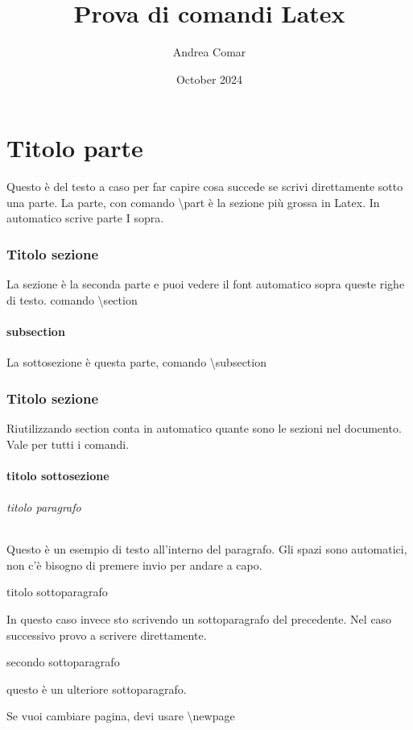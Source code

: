 \documentclass{article} %
\title{Prova di comandi Latex}
\author{Andrea Comar}
\date{October 2024}
\begin{document}
\maketitle %

\tableofcontents %

\newpage

\part{ Titolo parte } 
Questo è del testo a caso per far capire cosa succede se scrivi direttamente sotto una parte.
La parte, con comando \textbackslash part è la sezione più grossa in Latex. In automatico scrive parte I sopra. 

\section{ Titolo sezione }
La sezione è la seconda parte e puoi vedere il font automatico sopra queste righe di testo.
comando \textbackslash section
\subsection{ subsection }
La sottosezione è questa parte, comando \textbackslash subsection
\section{ Titolo sezione }
Riutilizzando section conta in automatico quante sono le sezioni nel documento. Vale per tutti i comandi.
\subsection{ titolo sottosezione}



\paragraph{titolo paragrafo}
Questo è un esempio di testo all'interno del paragrafo. 
Gli spazi sono automatici, non c'è bisogno di premere invio per andare a capo.
\subparagraph{titolo sottoparagrafo }  In questo caso invece sto scrivendo un sottoparagrafo del precedente. 
Nel caso successivo provo a scrivere direttamente.
\subparagraph{secondo sottoparagrafo} questo è un ulteriore sottoparagrafo.

Se vuoi cambiare pagina, devi usare \textbackslash newpage
\newpage
\end{document}

